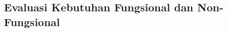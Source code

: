 \subsection{Evaluasi Kebutuhan Fungsional dan Non-Fungsional}
\label{subsec:evaluasi-kebutuhan-fungsional-dan-non-fungsional}
